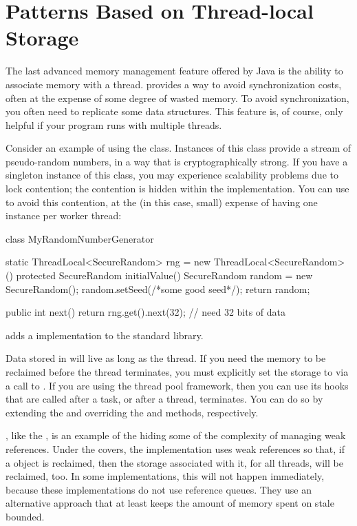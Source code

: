 \section{Patterns Based on Thread-local Storage}

The last advanced memory management feature offered by Java is the ability to
associate memory with a thread. \Tls provides a way to avoid
synchronization costs, often at the expense of some degree of wasted memory. To
avoid synchronization, you often need to replicate some data structures. This
feature is, of course, only helpful if your program runs with multiple threads.

Consider an example of using the  class. Instances of this
class provide a stream of pseudo-random numbers, in a way that is
cryptographically strong. If you have a singleton instance of this class, you may
experience scalability problems due to lock contention; the contention is hidden
within the  implementation. You can use \tls
to avoid this contention, at the (in this case, small) expense of having one
instance per worker thread:
\begin{shortlisting}
class MyRandomNumberGenerator {
   static ThreadLocal<SecureRandom> rng = new ThreadLocal<SecureRandom>() {
      protected SecureRandom initialValue() {
         SecureRandom random = new SecureRandom();
         random.setSeed(/*some good seed*/);
         return random;
      }
   }
   
   public int next() {
      return rng.get().next(32); // need 32 bits of data
   }
}
\end{shortlisting} 
\javaseven adds a  implementation to the standard
library.

Data stored in \tls will live as long as the thread. If you need
the memory to be reclaimed before the thread terminates, you must explicitly set
the storage to  via a call to . If you are using
the  thread pool framework, then you can use its
hooks that are called after a task, or after a thread, terminates. You can do so
by extending the  and overriding the
 and  methods, respectively.

\Tls, like the , is an example of the \jre hiding some of the
complexity of managing weak references. Under the covers, the \tls implementation
uses weak references so that, if a  object is reclaimed, then
the storage associated with it, for all threads, will be reclaimed, too. In some
implementations, this will not happen immediately, because these implementations
do not use reference queues. They use an alternative approach that at least
keeps the amount of memory spent on stale \tls bounded.

